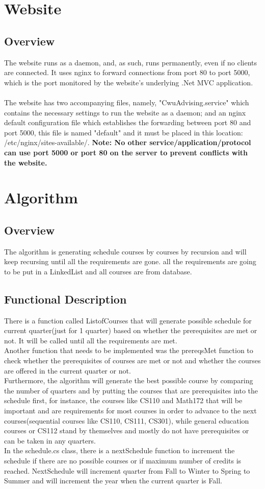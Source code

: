 \documentclass[letterpaper]{report}
\begin{document}
	\chapter{Website}
	\section{Overview}
	The website runs as a daemon, and, as such, runs permanently, even if no clients are connected. It uses nginx to forward connections from port 80 to port 5000, which is the port monitored by the website's underlying .Net MVC application.\\ \\ The website has two accompanying files, namely, "CwuAdvising.service" which contains the necessary settings to run the website as a daemon; and an nginx default configuration file which establishes the forwarding between port 80 and port 5000, this file is named "default" and it must be placed in this location: /etc/nginx/sites-available/. \textbf{Note: No other service/application/protocol can use port 5000 or port 80 on the server to prevent conflicts with the website.}
	\chapter{Algorithm}
	\section{Overview}
	The algorithm is generating schedule courses by courses by recursion and will keep recursing until all the requirements are gone. all the requirements are going to be put in a LinkedList and all courses are from database.\\
	\section{Functional Description}
	There is a function called ListofCourses that will generate possible schedule for current quarter(just for 1 quarter) based on whether the prerequisites are met or not. It will be called until all the requirements are met.\\
	Another function that needs to be implemented was the prereqsMet function to check whether the prerequisites of courses are met or not and whether the courses are offered in the current quarter or not.\\
	Furthermore, the algorithm will generate the best possible course by comparing the number of quarters and by putting the courses that are prerequisites into the schedule first, for instance, the courses like CS110 and Math172 that will be important and are requirements for most courses in order to advance to the next courses(sequential courses like CS110, CS111, CS301), while general education courses or CS112 stand by themselves and mostly do not have prerequisites or can be taken in any quarters.\\
	In the schedule.cs class, there is a nextSchedule function to increment the schedule if there are no possible courses or if maximum number of credits is reached. NextSchedule will increment quarter from Fall to Winter to Spring to Summer and will increment the year when the current quarter is Fall.
\end{document}
